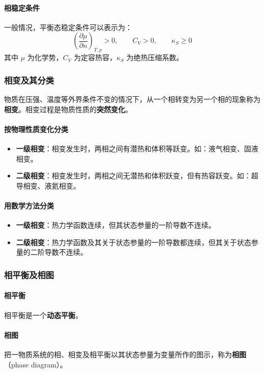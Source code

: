 \documentclass[UTF8]{ctexart}
\begin{document}
\paragraph{相稳定条件}
一般情况，平衡态稳定条件可以表示为：
\[
\left(\frac{\partial\mu}{\partial n}\right)_{T,p}>0,\qquad
C_V>0,\qquad
\kappa_S\ge 0
\]
其中 $\mu$ 为化学势，$C_V$ 为定容热容，$\kappa_S$ 为绝热压缩系数。

\subsubsection{相变及其分类}

物质在压强、温度等外界条件不变的情况下，从一个相转变为另一个相的现象称为\textbf{相变}。相变过程是物质性质的\textbf{突然变化}。

\paragraph{按物理性质变化分类}
\begin{itemize}[leftmargin=2em]
  \item \textbf{一级相变}：相变发生时，两相之间有潜热和体积等跃变。如：液气相变、固液相变。
  \item \textbf{二级相变}：相变发生时，两相之间无潜热和体积跃变，但有热容跃变。如：超导相变、液氦相变。
\end{itemize}

\paragraph{用数学方法分类}
\begin{itemize}[leftmargin=2em]
  \item \textbf{一级相变}：热力学函数连续，但其状态参量的一阶导数不连续。
  \item \textbf{二级相变}：热力学函数及其关于状态参量的一阶导数都连续，但其关于状态参量的二阶导数不连续。
\end{itemize}

\subsubsection{相平衡及相图}

\paragraph{相平衡}
相平衡是一个\textbf{动态平衡}。

\paragraph{相图}
把一物质系统的相、相变及相平衡以其状态参量为变量所作的图示，称为\textbf{相图}（phase diagram）。
\end{document}
